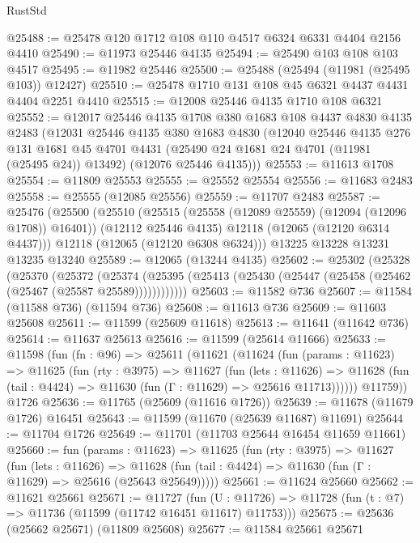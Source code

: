 \begin{lexlean}{RustStd}
\begin{coremodule}
@25488 := @25478 @120 @1712 @108 @110 @4517 @6324 @6331 @4404 @2156 @4410
@25490 := @11973 @25446 @4135
@25494 := @25490 @103 @108 @103 @4517
@25495 := @11982 @25446
@25500 := @25488 (@25494 (@11981 (@25495 @103)) @12427)
@25510 := @25478 @1710 @131 @108 @45 @6321 @4437 @4431 @4404 @2251 @4410
@25515 := @12008 @25446 @4135 @1710 @108 @6321
@25552 := @12017
    @25446
    @4135
    @1708
    @380
    @1683
    @108
    @4437
    @4830
    @4135
    @2483
    (@12031
      @25446
      @4135
      @380
      @1683
      @4830
      (@12040
        @25446
        @4135
        @276
        @131
        @1681
        @45
        @4701
        @4431
        (@25490 @24 @1681 @24 @4701 (@11981 (@25495 @24)) @13492)
        (@12076 @25446 @4135)))
@25553 := @11613 @1708
@25554 := @11809 @25553
@25555 := @25552 @25554
@25556 := @11683 @2483
@25558 := @25555 (@12085 @25556)
@25559 := @11707 @2483
@25587 := @25476
    (@25500
      (@25510
        (@25515 (@25558 (@12089 @25559) (@12094 (@12096 @1708)) @16401))
        (@12112 @25446 @4135)
        @12118
        (@12065 (@12120 @6314 @4437)))
      @12118
      (@12065 (@12120 @6308 @6324)))
    @13225
    @13228
    @13231
    @13235
    @13240
@25589 := @12065 (@13244 @4135)
@25602 := @25302
    (@25328
      (@25370
        (@25372
          (@25374 (@25395 (@25413 (@25430 (@25447 (@25458 (@25462 (@25467 (@25587 @25589))))))))))))
@25603 := @11582 @736
@25607 := @11584 (@11588 @736) (@11594 @736)
@25608 := @11613 @736
@25609 := @11603 @25608
@25611 := @11599 (@25609 @11618)
@25613 := @11641 (@11642 @736)
@25614 := @11637 @25613
@25616 := @11599 (@25614 @11666)
@25633 := @11598
    (fun (fn : @96) =>
    @25611
      (@11621
        (@11624
          (fun (params : @11623) =>
          @11625
            (fun (rty : @3975) =>
            @11627
              (fun (lets : @11626) =>
              @11628 (fun (tail : @4424) => @11630 (fun (Γ : @11629) => @25616 @11713))))))
        @11759))
    @1726
@25636 := @11765 (@25609 (@11616 @1726))
@25639 := @11678 (@11679 @1726) @16451
@25643 := @11599 (@11670 (@25639 @11687) @11691)
@25644 := @11704 @1726
@25649 := @11701 (@11703 @25644 @16454 @11659 @11661)
@25660 := fun (params : @11623) =>
  @11625
    (fun (rty : @3975) =>
    @11627
      (fun (lets : @11626) =>
      @11628 (fun (tail : @4424) => @11630 (fun (Γ : @11629) => @25616 (@25643 @25649)))))
@25661 := @11624 @25660
@25662 := @11621 @25661
@25671 := @11727
    (fun (U : @11726) => @11728 (fun (t : @7) => @11736 (@11599 (@11742 @16451 @11617) @11753)))
@25675 := @25636 (@25662 @25671) (@11809 @25608)
@25677 := @11584 @25661 @25671

\end{coremodule}
\end{lexlean}

